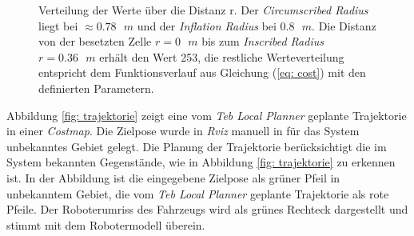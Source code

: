 		   		\begin{figure}[H]
		   	\centering
		   \caption{Verteilung der Werte über die Distanz r. Der \textit{Circumscribed Radius} liegt bei $\approx0.78\text{ }\si{m}$ und der \textit{Inflation Radius} bei $0.8\text{ }\si{m}$. Die Distanz von der besetzten Zelle $r=0\text{ }\si{m}$ bis zum \textit{Inscribed Radius} $r=0.36\text{ }\si{m}$ erhält den Wert 253, die restliche Werteverteilung entspricht dem Funktionsverlauf aus Gleichung (\ref{eq: cost}) mit den definierten Parametern.} 
		   \label{fig: costverteilung}
		   \end{figure}

		    
		    		
		    
		    
		    
		    Abbildung \ref{fig: trajektorie} zeigt eine vom \textit{Teb Local Planner} geplante Trajektorie in einer \textit{Costmap}. Die Zielpose wurde in \textit{Rviz} manuell in für das System unbekanntes Gebiet gelegt. Die Planung der Trajektorie berücksichtigt die im System bekannten Gegenstände, wie in Abbildung \ref{fig: trajektorie} zu erkennen ist. In der Abbildung ist die eingegebene Zielpose als grüner Pfeil in unbekanntem Gebiet, die vom \textit{Teb Local Planner} geplante Trajektorie als rote Pfeile. Der Roboterumriss des Fahrzeugs wird als grünes Rechteck dargestellt und stimmt mit dem Robotermodell überein.
		    

